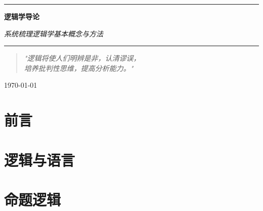 \documentclass[a4paper,11pt,twoside]{book}
\begin{document}
\begin{titlepage}
\centering
\vspace*{2cm}
{\color{black!80}\rule{\textwidth}{1pt}}
\vspace{1.5cm}

{\Huge\bfseries\color{black!90} 逻辑学导论 \par}
\vspace{0.5cm}
{\large\itshape 系统梳理逻辑学基本概念与方法 \par}

\vspace{1.5cm}
{\color{black!80}\rule{\textwidth}{1pt}}
\vspace{2cm}

\begin{minipage}{0.8\textwidth}
\centering
\begin{quotation}
\large\textit{"逻辑将使人们明辨是非，认清谬误，\\
培养批判性思维，提高分析能力。"}
\end{quotation}
\end{minipage}

\vfill

{\large \today \par}
\end{titlepage}

\frontmatter
\chapter*{前言}


\tableofcontents
\clearpage

\mainmatter

\chapter{逻辑与语言}













\chapter{命题逻辑}







\end{document}
